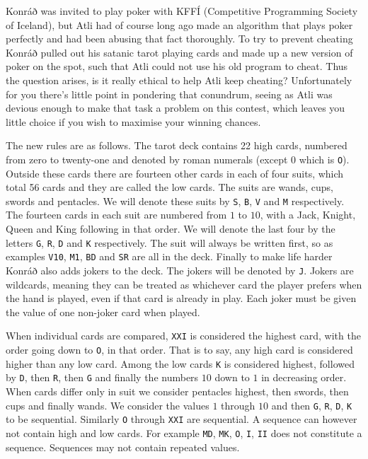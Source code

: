 
Konráð was invited to play poker with KFFÍ (Competitive Programming Society of Iceland),
but Atli had of course long ago made an algorithm that plays poker perfectly and had been abusing that fact thoroughly. 
To try to prevent cheating Konráð pulled out his satanic tarot playing cards and made up a new version of poker on the spot,
such that Atli could not use his old program to cheat.
Thus the question arises, is it really ethical to help Atli keep cheating?
Unfortunately for you there's little point in pondering that conundrum,
seeing as Atli was devious enough to make that task a problem on this contest,
which leaves you little choice if you wish to maximise your winning chances.

The new rules are as follows. The tarot deck contains 22 high cards, 
numbered from zero to twenty-one and denoted by roman numerals (except $0$ which is \texttt{O}).
Outside these cards there are fourteen other cards in each of four suits,
which total 56 cards and they are called the low cards. 
The suits are wands, cups, swords and pentacles. 
We will denote these suits by \texttt{S}, \texttt{B}, \texttt{V} and \texttt{M} respectively.
The fourteen cards in each suit are numbered from $1$ to $10$, with a Jack, Knight, Queen and King following in that order.
We will denote the last four by the letters \texttt{G}, \texttt{R}, \texttt{D} and \texttt{K} respectively.
The suit will always be written first,
so as examples \texttt{V10}, \texttt{M1}, \texttt{BD} and \texttt{SR} are all in the deck.
Finally to make life harder Konráð also adds jokers to the deck.
The jokers will be denoted by \texttt{J}. 
Jokers are wildcards, meaning they can be treated as whichever card the player prefers when the hand is played,
even if that card is already in play. 
Each joker must be given the value of one non-joker card when played.

When individual cards are compared, \texttt{XXI} is considered the highest card, with the order going down to \texttt{O},
in that order. That is to say, any high card is considered higher than any low card.
Among the low cards \texttt{K} is considered highest, followed by \texttt{D}, then \texttt{R},
then \texttt{G} and finally the numbers $10$ down to $1$ in decreasing order.
When cards differ only in suit we consider pentacles highest, then swords, then cups and finally wands.
We consider the values $1$ through $10$ and then \texttt{G}, \texttt{R}, \texttt{D}, \texttt{K} to be sequential.
Similarly \texttt{O} through \texttt{XXI} are sequential. A sequence can however not contain high and low cards.
For example \texttt{MD}, \texttt{MK}, \texttt{O}, \texttt{I}, \texttt{II} does not constitute a sequence.
Sequences may not contain repeated values.

